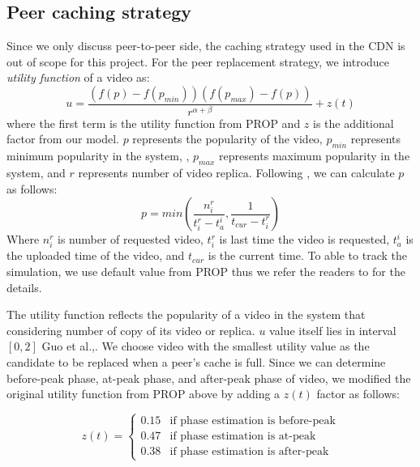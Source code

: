 \documentclass[10pt,final,journal,a4paper]{IEEEtran}
\begin{document}
\subsection{Peer caching strategy}\label{peercachingstrategy}
Since we only discuss peer-to-peer side, the caching strategy used in the CDN is out of scope for this project. 
For the peer replacement strategy, we introduce \textit{utility function} of a video as:
\begin{equation}
u = \frac{ (f(p) - f(p_{min})) (f(p_{max}) - f(p)) }{r^{\alpha + \beta}} + z(t)
\end{equation}
where the first term is the utility function from PROP and $z$ is the additional factor from our model. 
$p$ represents the popularity of the video, $p_{min}$ represents minimum popularity in the system, , $p_{max}$ represents maximum popularity in the system, and $r$ represents number of video replica.
Following \cite{1613869}, we can calculate $p$ as follows:
\begin{equation}
p = min \left(\frac{n_i^r}{t_i^r - t_a^i}  , \frac{1}{t_{cur} - t_i^r}\right)
\end{equation}
Where $n_i^r$ is number of requested video, $t_i^r$ is last time the video is requested, $t_a^i$ is the uploaded time of the video, and $t_{cur}$ is the current time.
To able to track the simulation, we use default value from PROP thus we refer the readers to \cite{1613869} for the details.

The utility function reflects the popularity of a video in the system that considering number of copy of its video or replica. 
$u$ value itself lies in interval $[0,2]$ Guo et al.,\cite{1613869}.
We choose video with the smallest utility value as the candidate to be replaced when a peer's cache is full.
Since we can determine before-peak phase, at-peak phase, and after-peak phase of video, we modified the original utility function from PROP above by adding a $z(t)$ factor as follows:

\begin{equation}
 z(t) = 
  \begin{cases}
   0.15 & \text{if phase estimation is before-peak} \\
   0.47 & \text{if phase estimation is at-peak} \\
   0.38 & \text{if phase estimation is after-peak}
  \end{cases}
\end{equation}\label{eq:zfactor}
\end{document}
